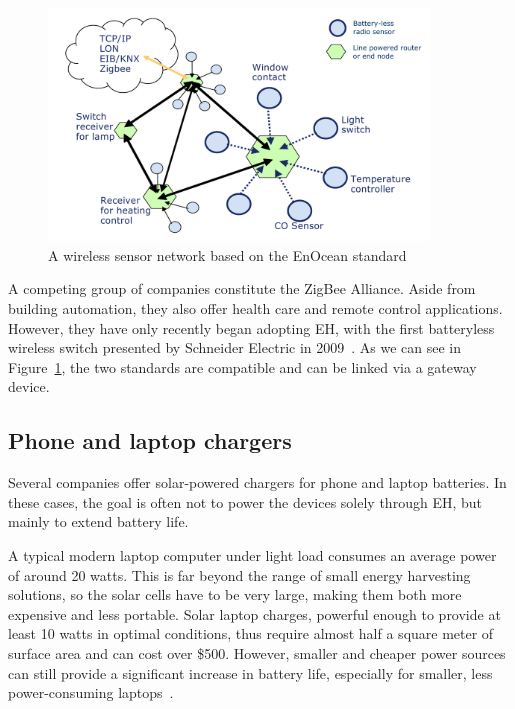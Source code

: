 \documentclass[a4paper,10pt]{article}
\begin{document}
\begin{figure}[h]
\centering
 \includegraphics[width=0.9\textwidth]{./Slike/EnOcean-shema}
\caption{A wireless sensor network based on the EnOcean standard~\cite{enocean}}
\label{fig:enocean-shema}
\end{figure}

A competing group of companies constitute the ZigBee Alliance. Aside from building automation, they also offer health care and remote control applications. However, they have only recently began adopting \ac{EH}, with the first batteryless wireless switch presented by Schneider Electric in 2009~\cite{schneider-zb}. As we can see in Figure~\ref{fig:enocean-shema}, the two standards are compatible and can be linked via a gateway device. 

\newpage
\subsection{Phone and laptop chargers}

Several companies offer solar-powered chargers for phone and laptop batteries. In these cases, the goal is often not to power the devices solely through \ac{EH}, but mainly to extend battery life. 

A typical modern laptop computer under light load consumes an average power of around 20 watts. This is far beyond the range of small energy harvesting solutions, so the solar cells have to be very large, making them both more expensive and less portable. Solar laptop charges, powerful enough to provide at least 10 watts in optimal conditions, thus require almost half a square meter of surface area and can cost over \$500. However, smaller and cheaper power sources can still provide a significant increase in battery life, especially for smaller, less power-consuming laptops~\cite{news:laptop-chargers}. 
\end{document}
